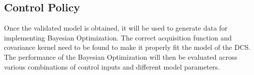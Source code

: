 \subsection{Control Policy}
Once the validated model is obtained, it will be used to generate data for implementing Bayesian Optimization. The correct acquisition function and covariance kernel need to be found to make it properly fit the model of the DCS. The performance of the Bayesian Optimization will then be evaluated across various combinations of control inputs and different model parameters. 


